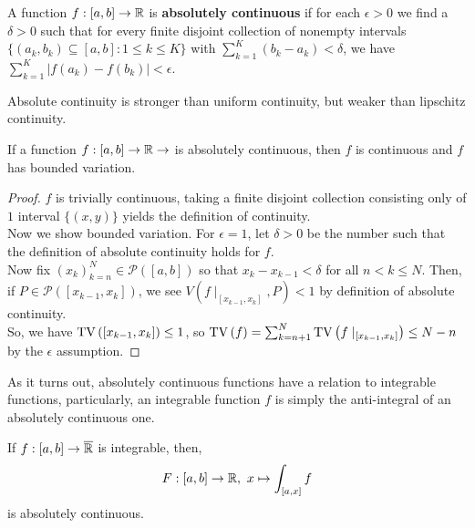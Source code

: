 \begin{definition}
	A function \(f: \left[ a, b \right]  \to \mathbb{R}\) is \textbf{absolutely continuous} if for each \(\epsilon > 0\) we find a \(\delta > 0\) such that for every finite disjoint collection of nonempty intervals \(\{\left( a_{k}, b_{k} \right) \subseteq \left[ a, b \right] : 1\le k \le K \} \) with \(\sum_{k=1}^{K} \left( b_{k} - a_{k} \right)  < \delta\), we have \(\sum_{k=1}^{K} \left| f\left( a_{k} \right) - f\left( b_{k} \right)  \right| < \epsilon\).
\end{definition}
\begin{remark}
	Absolute continuity is stronger than uniform continuity, but weaker than lipschitz continuity.
\end{remark}
\begin{theorem}
	If a function \(f: \left[ a, b \right] \to \mathbb{R} \to \) is absolutely continuous, then \(f\) is continuous and \(f\) has bounded variation.
\end{theorem}
\begin{proof}
	\(f\) is trivially continuous, taking a finite disjoint collection consisting only of \(1\) interval \(\{\left( x, y \right) \} \) 	yields the definition of continuity.\\
	Now we show bounded variation. For \(\epsilon = 1\), let \(\delta > 0\) be the number such that the definition of absolute continuity holds for \(f\).\\
	Now fix \(\left( x_{k} \right) _{k=n}^{N} \in \mathscr{P}\left( \left[ a, b \right]  \right) \) so that \(x_{k} - x_{k-1} < \delta\) for all \(n < k \le N\). Then, if \(P \in \mathscr{P}\left( \left[ x_{k-1}, x_{k} \right]  \right) \), we see \(V\left( f\mid_{\left[ x_{k-1}, x_{k} \right] }, P \right) < 1 \) by definition of absolute continuity.\\
	So, we have \(\operatorname{TV}\left( \left[ x_{k-1} , x_{k} \right]  \right) \le 1 \), so \(\operatorname{TV}\left( f \right)  = \sum_{k=n+1}^{N} \operatorname{TV}\left( f\mid_{\left[ x_{k-1}, x_{k} \right] } \right) \le N - n \) by the \(\epsilon\) assumption.
\end{proof}
As it turns out, absolutely continuous functions have a relation to integrable functions, particularly, an integrable function \(f\) is simply the anti-integral of an absolutely continuous one.
\begin{proposition}
	If \(f: \left[ a, b \right]  \to \overline{\mathbb{R}}\) is integrable, then, \[F: \left[ a, b \right]  \to \mathbb{R}, \ x\mapsto \int_{\left[ a, x \right] }f \] is absolutely continuous.
\end{proposition}

